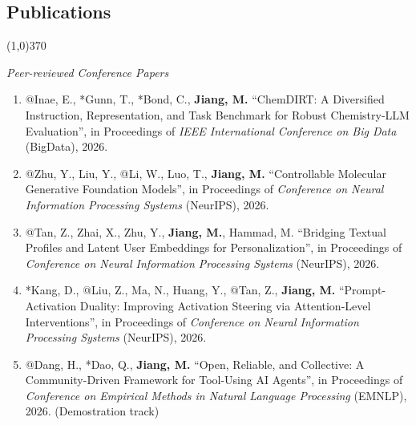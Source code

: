 \documentclass[10pt]{article}
\newenvironment{myindentpar}[1]%
{\begin{list}{}%
         {\setlength{\leftmargin}{#1}}%
         \item[]%
}
{\end{list}}
\newcounter{list}
\begin{document}
\subsection{}
\subsection{\sc Publications}
\vspace{-0.4cm} \line(1,0){370} \vspace{-0.1cm}

\begin{myindentpar}{0.00cm}

\hspace{-0.25cm}\textit{Peer-reviewed Conference Papers}

\begin{enumerate}[leftmargin=.5cm]

\item[C152] @Inae, E., *Gunn, T., *Bond, C., \textbf{Jiang, M.} ``ChemDIRT: A Diversified Instruction, Representation, and Task Benchmark for Robust Chemistry-LLM Evaluation'', in Proceedings of \textit{IEEE International Conference on Big Data} (BigData), 2026.

\item[C151] @Zhu, Y., Liu, Y., @Li, W., Luo, T., \textbf{Jiang, M.} ``Controllable Molecular Generative Foundation Models'', in Proceedings of \textit{Conference on Neural Information Processing Systems} (NeurIPS), 2026.

\item[C150] @Tan, Z., Zhai, X., Zhu, Y., \textbf{Jiang, M.}, Hammad, M. ``Bridging Textual Profiles and Latent User Embeddings for Personalization'', in Proceedings of \textit{Conference on Neural Information Processing Systems} (NeurIPS), 2026.
		
\item[C149] *Kang, D., @Liu, Z., Ma, N., Huang, Y., @Tan, Z., \textbf{Jiang, M.} ``Prompt-Activation Duality: Improving Activation Steering via Attention-Level Interventions'', in Proceedings of \textit{Conference on Neural Information Processing Systems} (NeurIPS), 2026.

\item[C148] @Dang, H., *Dao, Q., \textbf{Jiang, M.} ``Open, Reliable, and Collective: A Community-Driven Framework for Tool-Using AI Agents'', in Proceedings of \textit{Conference on Empirical Methods in Natural Language Processing} (EMNLP), 2026. (Demostration track)


\end{enumerate}
\end{myindentpar}
\end{document}
